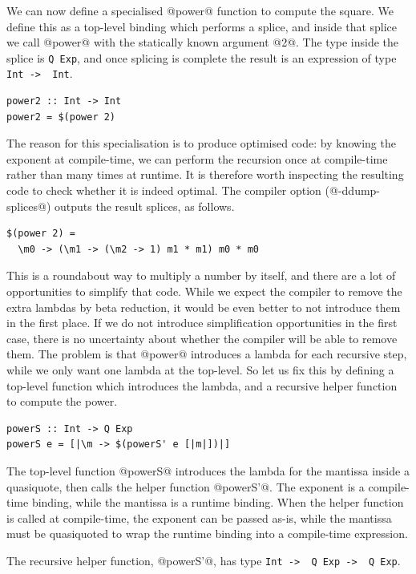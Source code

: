 We can now define a specialised @power@ function to compute the square.
We define this as a top-level binding which performs a splice, and inside that splice we call @power@ with the statically known argument @2@.
The type inside the splice is \lstinline/Q Exp/, and once splicing is complete the result is an expression of type \lstinline/Int ->  Int/.

\begin{lstlisting}
power2 :: Int -> Int
power2 = $(power 2)
\end{lstlisting}

The reason for this specialisation is to produce optimised code: by knowing the exponent at compile-time, we can perform the recursion once at compile-time rather than many times at runtime.
It is therefore worth inspecting the resulting code to check whether it is indeed optimal.
The compiler option (@-ddump-splices@) outputs the result splices, as follows.

\begin{lstlisting}
$(power 2) =
  \m0 -> (\m1 -> (\m2 -> 1) m1 * m1) m0 * m0
\end{lstlisting}

This is a roundabout way to multiply a number by itself, and there are a lot of opportunities to simplify that code.
While we expect the compiler to remove the extra lambdas by beta reduction, it would be even better to not introduce them in the first place.
If we do not introduce simplification opportunities in the first case, there is no uncertainty about whether the compiler will be able to remove them.
The problem is that @power@ introduces a lambda for each recursive step, while we only want one lambda at the top-level.
So let us fix this by defining a top-level function which introduces the lambda, and a recursive helper function to compute the power.

\begin{lstlisting}
powerS :: Int -> Q Exp
powerS e = [|\m -> $(powerS' e [|m|])|]
\end{lstlisting}

The top-level function @powerS@ introduces the lambda for the mantissa inside a quasiquote, then calls the helper function @powerS'@.
The exponent is a compile-time binding, while the mantissa is a runtime binding.
When the helper function is called at compile-time, the exponent can be passed as-is, while the mantissa must be quasiquoted to wrap the runtime binding into a compile-time expression.

The recursive helper function, @powerS'@, has type \lstinline/Int ->  Q Exp ->  Q Exp/.

